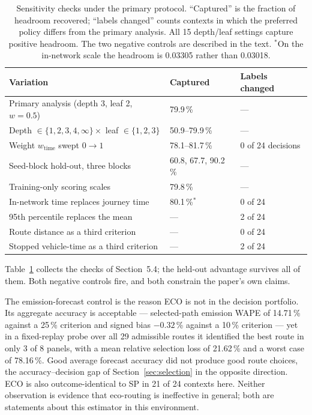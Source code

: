 \begin{table}[htb]
\centering\small
\caption{Sensitivity checks under the primary protocol. ``Captured'' is the fraction of
headroom recovered; ``labels changed'' counts contexts in which the preferred policy
differs from the primary analysis. All 15 depth/leaf settings capture positive headroom.
The two negative controls are described in the text. $^{\ast}$On the in-network scale the
headroom is 0.03305 rather than 0.03018.}
\label{tab:robust}
\setlength{\tabcolsep}{4pt}
\begin{tabular}{@{}lll@{}}
\toprule
Variation & Captured & Labels changed\\
\midrule
Primary analysis (depth 3, leaf 2, $w=0.5$) & 79.9\,\% & ---\\
Depth $\in\{1,2,3,4,\infty\}\times$ leaf $\in\{1,2,3\}$ & 50.9--79.9\,\% & --- \\
Weight $w_{\text{time}}$ swept $0\rightarrow1$ & 78.1--81.7\,\% & 0 of 24 decisions\\
Seed-block hold-out, three blocks & 60.8, 67.7, 90.2\,\% & ---\\
Training-only scoring scales & 79.8\,\% & ---\\
In-network time replaces journey time & 80.1\,\%$^{\ast}$ & 0 of 24\\
95th percentile replaces the mean & --- & 2 of 24\\
Route distance as a third criterion & --- & 0 of 24\\
Stopped vehicle-time as a third criterion & --- & 2 of 24\\
\bottomrule
\end{tabular}
\end{table}

Table~\ref{tab:robust} collects the checks of Section~5.4; the held-out advantage survives
all of them. Both negative controls fire, and both constrain the paper's own claims.

The emission-forecast control is the reason ECO is not in the decision portfolio. Its
aggregate accuracy is acceptable --- selected-path emission WAPE of 14.71\,\% against a
25\,\% criterion and signed bias $-0.32$\,\% against a 10\,\% criterion --- yet in a
fixed-replay probe over all 29 admissible routes it identified the best route in only 3 of
8 panels, with a mean relative selection loss of 21.62\,\% and a worst case of 78.16\,\%.
Good average forecast accuracy did not produce good route choices, the
accuracy--decision gap of Section~\ref{sec:selection} in the opposite direction. ECO is
also outcome-identical to SP in 21 of 24 contexts here. Neither observation is evidence
that eco-routing is ineffective in general; both are statements about this estimator in
this environment.

